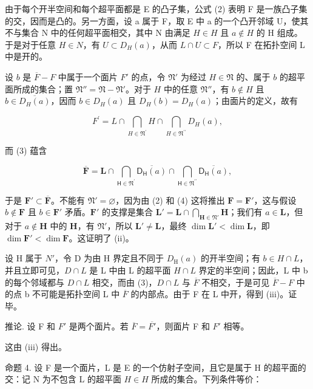 由于每个开半空间和每个超平面都是 E 的凸子集，公式 (2) 表明 F 是一族凸子集的交，因而是凸的。另一方面，设 a 属于 F，取 E 中 a 的一个凸开邻域 U，使其不与集合 N 中的任何超平面相交，其中 N 由满足 \(H \in H\) 且 \(a \notin H\) 的 H 组成。于是对于任意 \(H \in N\)，有 \(U \subset D_{H}(a)\)，从而 \(L \cap U \subset F\)，所以 F 在拓扑空间 L 中是开的。

设 \(b\) 是 \(\overline{F} - F\) 中属于一个面片 \(F'\) 的点，令 \(\mathfrak{N}'\) 为经过 \(H \in \mathfrak{N}\) 的、属于 \(b\) 的超平面所成的集合；置 \(\mathfrak{N}'' = \mathfrak{N} - \mathfrak{N}'\)。对于 \(H\) 中的任意 \(\mathfrak{N}''\)，有 \(b \notin H\) 且 \(b \in \overline{D_H(a)}\)，因而 \(b \in D_H(a)\) 且 \(D_H(b) = D_H(a)\)；由面片的定义，故有

\[
F ^ {\prime} = L \cap \bigcap_ {H \in \mathfrak {N} ^ {\prime}} H \cap \bigcap_ {H \in \mathfrak {N} ^ {\prime \prime}} D _ {H} (a),\tag{4}
\]

而 (3) 蕴含

\[
\overline {{\mathbf {F}}} = \mathbf {L} \cap \bigcap_ {\mathsf {H} \in \mathfrak {N} ^ {\prime}} \overline {{\mathsf {D} _ {\mathsf {H}} (a)}} \cap \bigcap_ {\mathsf {H} \in \mathfrak {N} ^ {\prime \prime}} \overline {{\mathsf {D} _ {\mathsf {H}} (a)}},\tag{5}
\]

于是 \(\mathbf{F}' \subset \overline{\mathbf{F}}\)。不能有 \(\mathfrak{N}' = \varnothing\)，因为由 (2) 和 (4) 这将推出 \(\mathbf{F} = \mathbf{F}'\)，这与假设 \(b \notin \mathbf{F}\) 且 \(b \in \mathbf{F}'\) 矛盾。\(\mathbf{F}'\) 的支撑是集合 \(\mathbf{L}' = \mathbf{L} \cap \bigcap_{\mathbf{H} \in \mathfrak{N}'} \mathbf{H}\)；我们有 \(a \in \mathbf{L}\)，但对于 \(a \notin \mathbf{H}\) 中的 \(\mathbf{H}\)，有 \(\mathfrak{N}'\)，所以 \(\mathbf{L}' \neq \mathbf{L}\)，最终 \(\dim \mathbf{L}' < \dim \mathbf{L}\)，即 \(\dim \mathbf{F}' < \dim \mathbf{F}\)。这证明了 (ii)。

设 H 属于 \(N'\)，令 D 为由 H 界定且不同于 \(D_{\mathrm{H}}(a)\) 的开半空间；有 \(b \in H \cap L\)，并且立即可见，\(D \cap L\) 是 L 中由 L 的超平面 \(H \cap L\) 界定的半空间；因此，L 中 b 的每个邻域都与 \(D \cap L\) 相交，而由 (3)，\(D \cap L\) 与 \(\overline{F}\) 不相交，于是可见 \(\overline{F} - F\) 中的点 b 不可能是拓扑空间 L 中 \(\overline{F}\) 的内部点。由于 F 在 L 中开，得到 (iii)。证毕。

推论. 设 F 和 \(F'\) 是两个面片。若 \(\overline{F} = \overline{F'}\)，则面片 F 和 \(F'\) 相等。

这由 (iii) 得出。

命题 4. 设 F 是一个面片，L 是 E 的一个仿射子空间，且它是属于 H 的超平面的交：记 N 为不包含 L 的超平面 \(H \in H\) 所成的集合。下列条件等价：

